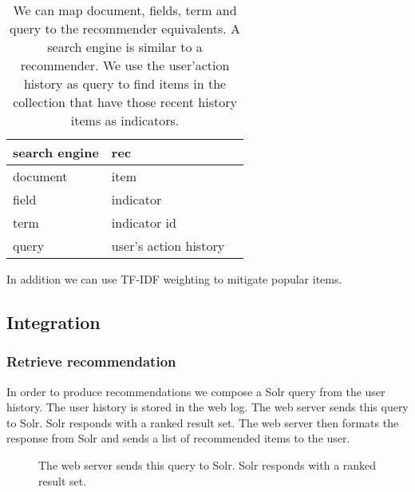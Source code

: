 \begin{table}
\begin{center}
\begin{tabular}{lll}
 search engine & \gls{rec}\\ \hline
  document & item\\ 
 field & indicator \\
 term & indicator id    \\
 query & user's action history \\
\end{tabular}
\end{center}
\caption{We can map document, fields, term and query to the recommender equivalents. A search engine is similar to a recommender. We use the user'action history as query to find items in the collection that have those recent history items as indicators. }
\label{tbl:comparison}
\end{table}

In addition we can use TF-IDF \cite{Manning} weighting to mitigate popular items.


\subsection{Integration}
\label{sec:integration}

\subsubsection{Retrieve recommendation}

In order to produce recommendations we compose a Solr query from the user history. The user history is stored in the web log. The web server sends this query to Solr. Solr responds with a ranked result set. The web server then formats the response from Solr and sends a list of recommended items to the user.

\begin{figure}
\centering
{}
\caption{The web server sends this query to Solr. Solr responds with a ranked result set.}
\end{figure}

